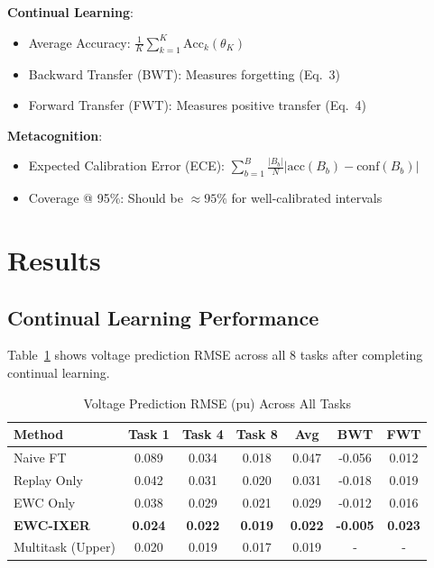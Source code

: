 \documentclass[journal]{IEEEtran}
\begin{document}
\textbf{Continual Learning}:
\begin{itemize}
    \item Average Accuracy: $\frac{1}{K} \sum_{k=1}^K \text{Acc}_k(\theta_K)$
    \item Backward Transfer (BWT): Measures forgetting (Eq.~3)
    \item Forward Transfer (FWT): Measures positive transfer (Eq.~4)
\end{itemize}

\textbf{Metacognition}:
\begin{itemize}
    \item Expected Calibration Error (ECE): $\sum_{b=1}^B \frac{|B_b|}{N} |\text{acc}(B_b) - \text{conf}(B_b)|$
    \item Coverage @ 95\%: Should be $\approx 95\%$ for well-calibrated intervals
\end{itemize}

\section{Results}

\subsection{Continual Learning Performance}

Table~\ref{tab:main_results} shows voltage prediction RMSE across all 8 tasks after completing continual learning.

\begin{table}[h]
\centering
\caption{Voltage Prediction RMSE (pu) Across All Tasks}
\label{tab:main_results}
\begin{tabular}{lcccccc}
\toprule
Method & Task 1 & Task 4 & Task 8 & Avg & BWT & FWT \\
\midrule
Naive FT & 0.089 & 0.034 & 0.018 & 0.047 & -0.056 & 0.012 \\
Replay Only & 0.042 & 0.031 & 0.020 & 0.031 & -0.018 & 0.019 \\
EWC Only & 0.038 & 0.029 & 0.021 & 0.029 & -0.012 & 0.016 \\
\textbf{EWC-IXER} & \textbf{0.024} & \textbf{0.022} & \textbf{0.019} & \textbf{0.022} & \textbf{-0.005} & \textbf{0.023} \\
Multitask (Upper) & 0.020 & 0.019 & 0.017 & 0.019 & - & - \\
\bottomrule
\end{tabular}
\end{table}
\end{document}
